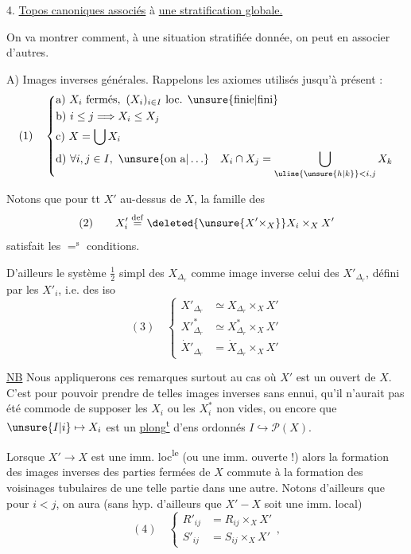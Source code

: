 
4. \uline{Topos canoniques associés} à \uline{une stratification
globale.}

On va montrer comment, à une situation
stratifiée donnée, on peut en associer d'autres.

A) Images inverses générales. Rappelons les
axiomes utilisés jusqu'à présent :
\[
(1)\quad\left\{\begin{aligned}
&\text{a) }X_i\text{ fermés},\ (X_i)_{i\in I}\text{ loc. \unsure{finie|fini}}\\
&\text{b) }i\leq j\Longrightarrow X_i\leq X_j\\
&\text{c) }X=\bigcup X_i\\
&\text{d) }\forall i,j\in I,\ \unsure{\text{on a}|\ldots}\quad X_i\cap X_j=\bigcup_{\uline{\unsure{h|k}}<i,j}X_k
\end{aligned}\right.
\]

Notons que pour tt $X'$ au-dessus de
$X$, la famille des
\[
(2)\qquad X'_i\overset{\mathrm{def}}=\deleted{\unsure{X'\times_X}}X_i\times_X X'
\]
satisfait les  $=^{\mathrm s}$ conditions.

D'ailleurs le système $\frac12$ simpl des
$X_{\Delta_r}$  comme image inverse celui
des $X'_{\Delta_r}$, défini par les $X'_i$,
 i.e. des iso
\[
(3)\quad\left\{\begin{aligned}
X'_{\Delta_r}&\simeq X_{\Delta_r}\times_X X'\\
X'^{*}_{\Delta_r}&\simeq X^*_{\Delta_r}\times_X X'\\
\dot X'_{\Delta_r}&=\dot X_{\Delta_r}\times_X X'
\end{aligned}\right.
\]


\uline{NB} Nous appliquerons ces remarques surtout au
cas où $X'$ est un ouvert de $X$. C'est pour
pouvoir prendre de telles images inverses sans
ennui, qu'il n'aurait pas été commode
de supposer les $X_i$ ou les $X_i^*$ non vides,
ou encore que $\unsure{I|i}\mapsto X_i$ est un \uline{plong\textsuperscript{t}}
d'ens ordonnés $I\hookrightarrow\mathcal P(X)$.

Lorsque $X'\to X$ est une imm. loc\textsuperscript{le}  
  (ou une imm. ouverte !) alors
la formation des images inverses des
parties  fermées de $X$ commute à la
formation des voisinages tubulaires de
une telle partie dans une autre. Notons
d'ailleurs que pour $i<j$, on aura
(sans hyp. d'ailleurs que $X'-X$ soit une
imm. local)
\[
(4)\quad\left\{\begin{aligned}
R'_{ij}&=R_{ij}\times_X X'\\
S'_{ij}&=S_{ij}\times_X X'
\end{aligned}\right.,
\]

